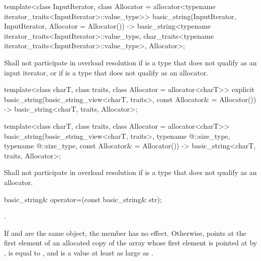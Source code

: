 \begin{itemdecl}
template<class InputIterator,
         class Allocator = allocator<typename iterator_traits<InputIterator>::value_type>>
  basic_string(InputIterator, InputIterator, Allocator = Allocator())
    -> basic_string<typename iterator_traits<InputIterator>::value_type,
                    char_traits<typename iterator_traits<InputIterator>::value_type>,
                    Allocator>;
\end{itemdecl}

\begin{itemdescr}
\pnum
\remarks Shall not participate in overload resolution if
 is a type that does not qualify as an input iterator,
or if  is a type that does not qualify as an allocator.
\end{itemdescr}

\begin{itemdecl}
template<class charT,
         class traits,
         class Allocator = allocator<charT>>
  explicit basic_string(basic_string_view<charT, traits>, const Allocator& = Allocator())
    -> basic_string<charT, traits, Allocator>;

template<class charT,
         class traits,
         class Allocator = allocator<charT>>
  basic_string(basic_string_view<charT, traits>,
               typename @\seebelow@::size_type, typename @\seebelow@::size_type,
               const Allocator& = Allocator())
    -> basic_string<charT, traits, Allocator>;
\end{itemdecl}

\begin{itemdescr}
\pnum
\remarks Shall not participate in overload resolution if
 is a type that does not qualify as
an allocator.
\end{itemdescr}

%
\begin{itemdecl}
basic_string& operator=(const basic_string& str);
\end{itemdecl}

\begin{itemdescr}
\pnum
\returns
{}.

\pnum
\ensures
If  and  are the same object, the member has no effect.
Otherwise,
 points at the first element of an allocated copy
of the array whose first element is pointed at by ,
 is equal to , and
 is a value at least as large as .
\end{itemdescr}

